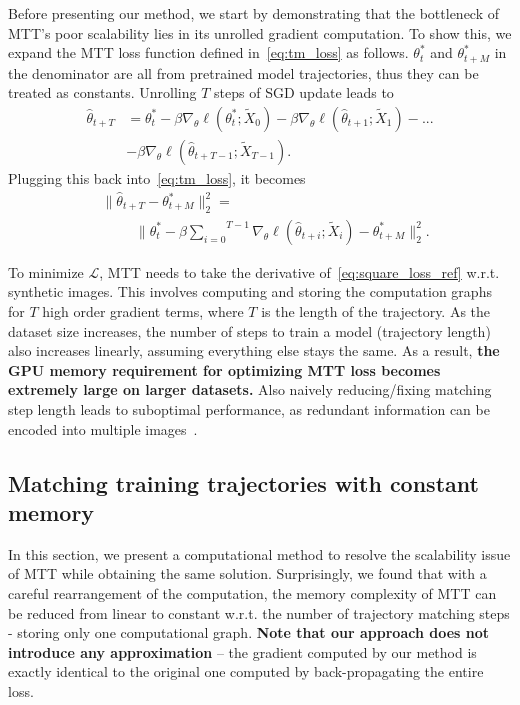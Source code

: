 \documentclass[10pt,twocolumn,letterpaper]{article}
\begin{document}
Before presenting our method, we start by demonstrating that the bottleneck of MTT's poor scalability lies in its unrolled gradient computation. To show this, we expand the MTT loss function defined in~\cref{eq:tm_loss} as follows. $\theta_t^{*}$ and $\theta_{t+M}^{*}$ in the denominator are all from pretrained model trajectories, thus they can be treated as constants. Unrolling $T$ steps of SGD update leads to 
\begin{align}
    \hat{\theta}_{t+T} &= \theta_{t}^* - \beta\nabla_{\theta} \ell(\theta_{t}^{*};\tilde{X}_0) - \beta\nabla_{\theta} \ell(\hat{\theta}_{t+1};\tilde{X}_{1}) - ... \nonumber\\
    &- \beta\nabla_{\theta} \ell(\hat{\theta}_{t+T-1};\tilde{X}_{T-1}). \label{eq:expansion}
\end{align}
Plugging this back into~\cref{eq:tm_loss}, it becomes
\begin{align}
    \label{eq:square_loss_ref}
    &\|\hat{\theta}_{t+T}-\theta_{t+M}^*\|^2_2=\nonumber\\
    &\hspace{1cm}\|\theta_{t}^* - \beta\overset{T-1}{\underset{i=0}{\sum}}\nabla_{\theta} \ell(\hat{\theta}_{t+i};\tilde{X}_i) - \theta_{t+M}^*\|^2_2.
\end{align}

To minimize $\mathcal{L}$, MTT needs to take the derivative of~\cref{eq:square_loss_ref} w.r.t. synthetic images. This involves computing and storing the computation graphs for $T$ high order gradient terms, where $T$ is the length of the trajectory. As the dataset size increases, the number of steps to train a model (trajectory length) also increases linearly, assuming everything else stays the same. As a result, \textbf{the GPU memory requirement for optimizing MTT loss becomes extremely large on larger datasets.} Also naively reducing/fixing matching step length leads to suboptimal performance, as redundant information can be encoded into multiple images~\cite{cazenavette2022dataset}.

\subsection{Matching training trajectories with constant memory}
\label{sec.constant_memory}
In this section, we present a computational method to resolve the scalability issue of MTT while obtaining the same solution.
Surprisingly, we found that with a careful rearrangement of the computation, the memory complexity of MTT can be reduced from linear to constant w.r.t. the 
number of trajectory matching steps - storing only one computational graph. {\bf Note that our approach does not introduce any approximation} --  the gradient computed by our method is exactly identical to the original one computed by back-propagating the entire loss.
\end{document}
